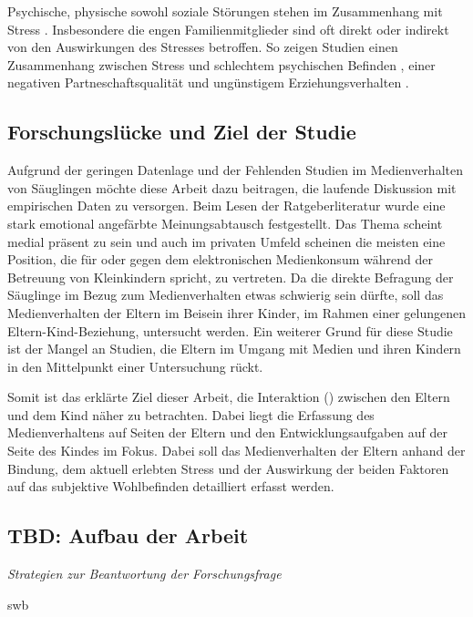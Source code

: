 Psychische, physische sowohl soziale Störungen stehen im Zusammenhang mit Stress \cite{Elfering2002, Burisch1994}. Insbesondere die engen Familienmitglieder sind oft direkt oder indirekt von den Auswirkungen des Stresses betroffen. So zeigen Studien einen Zusammenhang zwischen Stress und schlechtem psychischen Befinden \cite{Burisch1994, Krohne1997}, einer negativen Partneschaftsqualität \cite{Bodenmann2000, Bodenmann1999, Bodenmann2000a} und ungünstigem Erziehungsverhalten \cite{Abidin1992, Belsky1984, WebsterStratton2000}.

\subsection{Forschungslücke und Ziel der Studie}
Aufgrund der geringen Datenlage und der Fehlenden Studien im Medienverhalten von Säuglingen möchte diese Arbeit dazu beitragen, die laufende Diskussion mit empirischen Daten zu versorgen. Beim Lesen der Ratgeberliteratur wurde eine stark emotional angefärbte Meinungsabtausch festgestellt. Das Thema scheint medial präsent zu sein und auch im privaten Umfeld scheinen die meisten eine Position, die für oder gegen dem elektronischen Medienkonsum während der Betreuung von Kleinkindern spricht, zu vertreten. Da die direkte Befragung der Säuglinge im Bezug zum Medienverhalten etwas schwierig sein dürfte, soll das Medienverhalten der Eltern im Beisein ihrer Kinder, im Rahmen einer gelungenen Eltern-Kind-Beziehung, untersucht werden. Ein weiterer Grund für diese Studie ist der Mangel an Studien, die Eltern im Umgang mit Medien und ihren Kindern in den Mittelpunkt einer Untersuchung rückt.  

Somit ist das erklärte Ziel dieser Arbeit, die Interaktion  () zwischen den Eltern und dem Kind näher zu betrachten. Dabei liegt die Erfassung des Medienverhaltens auf Seiten der Eltern und den Entwicklungsaufgaben auf der Seite des Kindes im Fokus. Dabei soll das Medienverhalten der Eltern anhand der Bindung, dem aktuell erlebten Stress und der Auswirkung der beiden Faktoren auf das subjektive Wohlbefinden detailliert erfasst werden. 

\subsection{TBD: Aufbau der Arbeit} \label{sec:Aufbau}
\textit{Strategien zur Beantwortung der Forschungsfrage}

\gls{swb}

